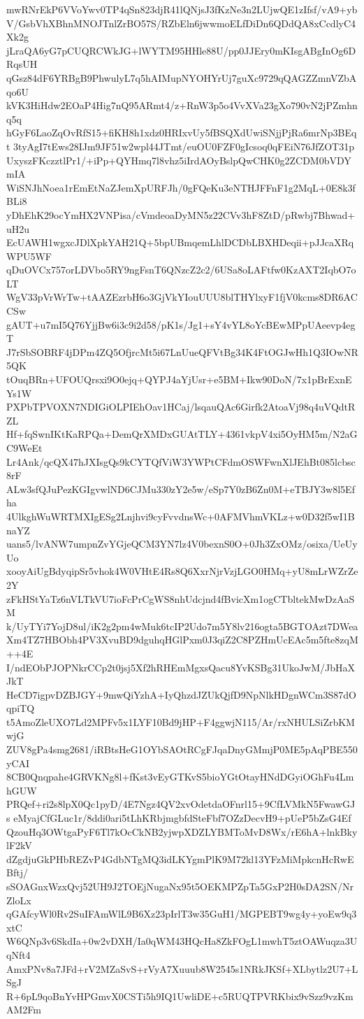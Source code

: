 mwRNrEkP6VVoYwv0TP4qSn823djR41lQNjsJ3fKzNe3n2LUjwQE1zIfsf/vA9+yb
V/GsbVhXBhnMNOJTnlZrBO57S/RZbEln6jwwmoELfDiDn6QDdQA8xCcdlyC4Xk2g
jLraQA6yG7pCUQRCWkJG+lWYTM95HHle88U/pp0JJEry0mKIsgABgInOg6DRqsUH
qGsz84dF6YRBgB9PhwulyL7q5hAIMupNYOHYrUj7guXc9729qQAGZZmnVZbAqo6U
kVK3HiHdw2EOaP4Hig7nQ95ARmt4/z+RnW3p5o4VvXVa23gXo790vN2jPZmhnq5q
hGyF6LaoZqOvRfS15+fiKH8h1xdz0HRIxvUy5fBSQXdUwiSNjjPjRa6mrNp3BEqt
3tyAgI7tEws28IJm9JF51w2wpl44JTmt/euOU0FZF0gIcsoq0qFEiN76JfZOT31p
UxyszFKczztlPr1/+iPp+QYHmq7l8vhz5iIrdAOyBslpQwCHK0g2ZCDM0bVDYmIA
WiSNJhNoea1rEmEtNaZJemXpURFJh/0gFQeKu3eNTHJFFnF1g2MqL+0E8k3fBLi8
yDhEhK29ocYmHX2VNPisa/cVmdeoaDyMN5z22CVv3hF8ZtD/pRwbj7Bhwad+uH2u
EcUAWH1wgxcJDlXpkYAH21Q+5bpUBmqemLhlDCDbLBXHDeqii+pJJcaXRqWPU5WF
qDuOVCx757orLDVbo5RY9ngFsnT6QNzcZ2c2/6USa8oLAFtfw0KzAXT2IqbO7oLT
WgV33pVrWrTw+tAAZEzrbH6o3GjVkYIouUUU8blTHYlxyF1fjV0kcms8DR6ACCSw
gAUT+u7mI5Q76YjjBw6i3c9i2d58/pK1s/Jg1+sY4vYL8oYcBEwMPpUAeevp4egT
J7rSbSOBRF4jDPm4ZQ5OfjrcMt5i67LnUueQFVtBg34K4FtOGJwHh1Q3IOwNR5QK
tOuqBRn+UFOUQrsxi9O0ejq+QYPJ4aYjUsr+e5BM+Ikw90DoN/7x1pBrExnEYs1W
PXPbTPVOXN7NDIGiOLPIEhOav1HCaj/lsqauQAc6Girfk2AtoaVj98q4uVQdtRZL
Hf+fqSwnIKtKaRPQa+DemQrXMDxGUAtTLY+4361vkpV4xi5OyHM5m/N2aGC9WeEt
Lr4Ank/qcQX47hJXIsgQs9kCYTQfViW3YWPtCFdmOSWFwnXlJEhBt085lcbsc8rF
ALw3sfQJuPezKGIgvwlND6CJMu330zY2e5w/eSp7Y0zB6Zn0M+eTBJY3w8l5Efha
4UlkghWuWRTMXIgESg2Lnjhvi9cyFvvdnsWc+0AFMVhmVKLz+w0D32f5wI1BnaYZ
uans5/lvANW7umpnZvYGjeQCM3YN7lz4V0bexnS0O+0Jh3ZxOMz/osixa/UeUyUo
xooyAiUgBdyqipSr5vhok4W0VHtE4Rs8Q6XxrNjrVzjLGO0HMq+yU8mLrWZrZe2Y
zFkHStYaTz6nVLTkVU7ioFcPrCgWS8nhUdcjnd4fBvicXm1ogCTbltekMwDzAaSM
k/UyTYi7YojD8ul/iK2g2pm4wMuk6tcIP2Udo7m5Y8lv216ogta5BGTOAzt7DWea
Xm4TZ7HBObh4PV3XvuBD9dguhqHGlPxm0J3qiZ2C8PZHmUcEAc5m5fte8zqM++4E
I/ndEObPJOPNkrCCp2t0jsj5Xf2hRHEmMgxsQacu8YvKSBg31UkoJwM/JbHaXJkT
HeCD7igpvDZBJGY+9mwQiYzhA+IyQhzdJZUkQjfD9NpNlkHDgnWCm3S87dOqpiTQ
t5AmoZleUXO7Ld2MPFv5x1LYF10Bd9jHP+F4ggwjN115/Ar/rxNHULSiZrbKMwjG
ZUV8gPa4smg2681/iRBtsHeG1OYbSAOtRCgFJqaDnyGMmjP0ME5pAqPBE550yCAI
8CB0Qnqpahe4GRVKNg8l+fKst3vEyGTKvS5bioYGtOtayHNdDGyiOGhFu4LmhGUW
PRQef+ri2s8lpX0Qc1pyD/4E7Ngz4QV2xvOdetdaOFnrl15+9CfLVMkN5FwawGJs
eMyajCfGLuc1r/8ddi0ari5tLhKRbjmgbfdSteFbf7OZzDecvH9+pUeP5bZsG4Ef
QzouHq3OWtgaPyF6Tl7kOcCkNB2yjwpXDZLYBMToMvD8Wx/rE6hA+lnkBkylF2kV
dZgdjuGkPHbREZvP4GdbNTgMQ3idLKYgmPlK9M72kl13YFzMiMpkcnHcRwEBftj/
sSOAGnxWzxQvj52UH9J2TOEjNugaNx95t5OEKMPZpTa5GxP2H0sDA2SN/NrZloLx
qGAfcyWl0Rv2SuIFAmWlL9B6Xz23pIrlT3w35GuH1/MGPEBT9wg4y+yoEw9q3xtC
W6QNp3v6SkdIa+0w2vDXH/Ia0qWM43HQcHa8ZkFOgL1mwhT5ztOAWuqza3UqNft4
AmxPNv8a7JFd+rV2MZaSvS+rVyA7Xuuub8W2545s1NRkJKSf+XLbytlz2U7+LSgJ
R+6pL9qoBnYvHPGmvX0CSTi5h9IQ1UwliDE+c5RUQTPVRKbix9vSzz9vzKmAM2Fm
